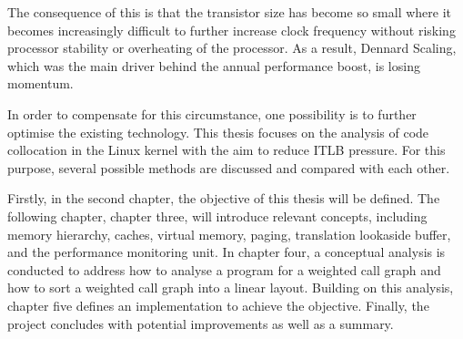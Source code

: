 The consequence of this is that the transistor size has become so small where it becomes increasingly difficult to further increase clock frequency without risking processor stability or overheating of the processor. As a result, Dennard Scaling, which was the main driver behind the annual performance boost, is losing momentum. \cite{berger} \cite{quantivapproach}

In order to compensate for this circumstance, one possibility is to further optimise the existing technology. This thesis focuses on the analysis of code collocation in the Linux kernel with the aim to reduce ITLB pressure. For this purpose, several possible methods are discussed and compared with each other. 

Firstly, in the second chapter, the objective of this thesis will be defined. The following chapter, chapter three, will introduce relevant concepts, including memory hierarchy, caches, virtual memory, paging, translation lookaside buffer, and the performance monitoring unit. In chapter four, a conceptual analysis is conducted to address how to analyse a program for a weighted call graph and how to sort a weighted call graph into a linear layout. Building on this analysis, chapter five defines an implementation to achieve the objective. Finally, the project concludes with potential improvements as well as a summary.